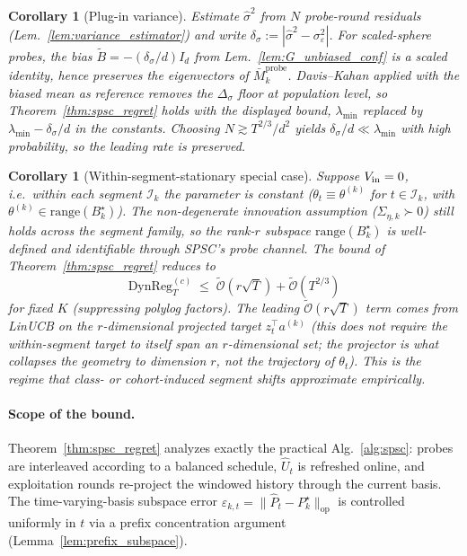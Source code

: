 \documentclass{article}
\newcommand{\op}{\mathrm{op}}
\newcommand{\cI}{\mathcal{I}}
\newcommand{\tilO}{\widetilde{\mathcal{O}}}
\newcommand{\DynReg}{\mathrm{DynReg}}
\newtheorem{corollary}[theorem]{Corollary}
\begin{document}
\begin{corollary}[Plug-in variance]
\label{cor:plugin_variance}
Estimate $\widehat\sigma^2$ from $N$ probe-round residuals
(Lem.~\ref{lem:variance_estimator}) and write
$\delta_\sigma:=|\widehat\sigma^2-\sigma_\varepsilon^2|$. For
scaled-sphere probes, the bias
$\widetilde B=-(\delta_\sigma/d)I_d$ from
Lem.~\ref{lem:G_unbiased_conf} is a scaled identity, hence preserves
the eigenvectors of $\bar M_k^{\mathrm{probe}}$. Davis--Kahan applied
with the biased mean as reference removes the
$\Delta_\sigma$ floor at population level, so
Theorem~\ref{thm:spsc_regret} holds with the displayed bound,
$\lambda_{\min}$ replaced by $\lambda_{\min}-\delta_\sigma/d$ in the
constants. Choosing $N\gtrsim T^{2/3}/d^2$ yields
$\delta_\sigma/d\ll\lambda_{\min}$ with high probability, so the
leading rate is preserved.
\end{corollary}

\begin{corollary}[Within-segment-stationary special case]
\label{cor:stationary_within}
Suppose $V_{\rm in}=0$, i.e.\ within each segment $\cI_k$ the parameter
is constant ($\theta_t\equiv\theta^{(k)}$ for $t\in\cI_k$, with
$\theta^{(k)}\in\mathrm{range}(B^\star_k)$). The non-degenerate
innovation assumption ($\Sigma_{\eta,k}\succ 0$) still holds
\emph{across} the segment family, so the rank-$r$ subspace
$\mathrm{range}(B^\star_k)$ is well-defined and identifiable through
SPSC's probe channel. The bound of Theorem~\ref{thm:spsc_regret}
reduces to
\[
\DynReg_T^{(c)} \;\le\; \tilO(r\sqrt{T}) + \tilO(T^{2/3})
\]
for fixed $K$ (suppressing polylog factors). The leading
$\tilO(r\sqrt{T})$ term comes from LinUCB on the $r$-dimensional
projected target $z_t^\top a^{(k)}$ (this does not require the within-segment
target to itself span an $r$-dimensional set; the projector is what
collapses the geometry to dimension $r$, not the trajectory of
$\theta_t$). This is the regime that class- or cohort-induced segment
shifts approximate empirically.
\end{corollary}

\paragraph{Scope of the bound.} Theorem~\ref{thm:spsc_regret} analyzes
exactly the practical Alg.~\ref{alg:spsc}: probes are interleaved
according to a balanced schedule, $\widehat U_t$ is refreshed online,
and exploitation rounds re-project the windowed history through the
current basis. The time-varying-basis subspace error
$\varepsilon_{k,t}=\|\widehat P_t-P_k^\star\|_\op$ is controlled
uniformly in $t$ via a prefix concentration argument
(Lemma~\ref{lem:prefix_subspace}).
\end{document}
